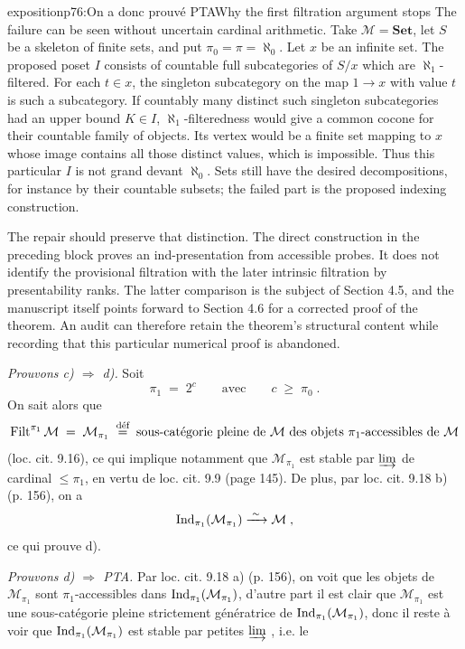 \begin{dcomment}{exposition}{p76:On a donc prouvé PTA}{Why the first filtration argument stops}
The failure can be seen without uncertain cardinal arithmetic.  Take $\mathcal M=\mathbf{Set}$, let $S$ be a skeleton of finite sets, and put $\pi_0=\pi=\aleph_0$.  Let $x$ be an infinite set.  The proposed poset $I$ consists of countable full subcategories of $S/x$ which are $\aleph_1$-filtered.  For each $t\in x$, the singleton subcategory on the map $1\to x$ with value $t$ is such a subcategory.  If countably many distinct such singleton subcategories had an upper bound $K\in I$, $\aleph_1$-filteredness would give a common cocone for their countable family of objects.  Its vertex would be a finite set mapping to $x$ whose image contains all those distinct values, which is impossible.  Thus this particular $I$ is not grand devant $\aleph_0$.  Sets still have the desired decompositions, for instance by their countable subsets; the failed part is the proposed indexing construction.

The repair should preserve that distinction.  The direct construction in the preceding block proves an ind-presentation from accessible probes.  It does not identify the provisional filtration with the later intrinsic filtration by presentability ranks.  The latter comparison is the subject of Section 4.5, and the manuscript itself points forward to Section 4.6 for a corrected proof of the theorem.  An audit can therefore retain the theorem's structural content while recording that this particular numerical proof is abandoned.
\end{dcomment}


\textit{Prouvons c) $\Longrightarrow$ d).} Soit
\[
\pi_1 \;=\; 2^c \qquad \text{avec} \qquad c \;\geqslant\; \pi_0 \;.
\]
On sait alors que
\[
\operatorname{Filt}^{\pi_1}\mathcal{M} \;=\; \mathcal{M}_{\pi_1} \;\overset{\text{déf}}{=}\; \text{sous-catégorie pleine de $\mathcal{M}$ des objets $\pi_1$-accessibles de $\mathcal{M}$}
\]
(loc. cit. 9.16), ce qui implique notamment que $\mathcal{M}_{\pi_1}$ est stable par $\varinjlim$ de cardinal $\leqslant \pi_1$, en vertu de loc. cit. 9.9 (page 145). De plus,
par loc. cit. 9.18 b) (p. 156), on a
\[
\operatorname{Ind}_{\pi_1}(\mathcal{M}_{\pi_1}) \xrightarrow{\;\sim\;} \mathcal{M} \;,
\]
ce qui prouve d).

\textit{Prouvons d) $\Longrightarrow$ PTA.} Par loc. cit. 9.18 a) (p. 156), on voit que les objets de $\mathcal{M}_{\pi_1}$ sont $\pi_1$-accessibles dans $\operatorname{Ind}_{\pi_1}(\mathcal{M}_{\pi_1})$, d'autre part il est clair que $\mathcal{M}_{\pi_1}$ est une sous-catégorie pleine strictement génératrice de $\operatorname{Ind}_{\pi_1}(\mathcal{M}_{\pi_1})$, donc il reste à voir que $\operatorname{Ind}_{\pi_1}(\mathcal{M}_{\pi_1})$ est stable par petites $\varinjlim$ , i.e. le

